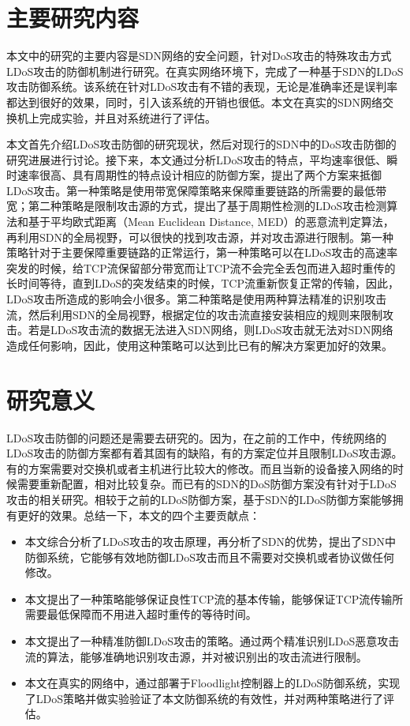 \section{主要研究内容}
\label{sec:work}
本文中的研究的主要内容是SDN网络的安全问题，针对DoS攻击的特殊攻击方式LDoS攻击的防御机制进行研究。在真实网络环境下，完成了一种基于SDN的LDoS攻击防御系统。该系统在针对LDoS攻击有不错的表现，无论是准确率还是误判率都达到很好的效果，同时，引入该系统的开销也很低。本文在真实的SDN网络交换机上完成实验，并且对系统进行了评估。

本文首先介绍LDoS攻击防御的研究现状，然后对现行的SDN中的DoS攻击防御的研究进展进行讨论。接下来，本文通过分析LDoS攻击的特点，平均速率很低、瞬时速率很高、具有周期性的特点设计相应的防御方案，提出了两个方案来抵御LDoS攻击。第一种策略是使用带宽保障策略来保障重要链路的所需要的最低带宽；第二种策略是限制攻击源的方式，提出了基于周期性检测的LDoS攻击检测算法和基于平均欧式距离（Mean Euclidean Distance, MED）的恶意流判定算法，再利用SDN的全局视野，可以很快的找到攻击源，并对攻击源进行限制。第一种策略针对于主要保障重要链路的正常运行，第一种策略可以在LDoS攻击的高速率突发的时候，给TCP流保留部分带宽而让TCP流不会完全丢包而进入超时重传的长时间等待，直到LDoS的突发结束的时候，TCP流重新恢复正常的传输，因此，LDoS攻击所造成的影响会小很多。第二种策略是使用两种算法精准的识别攻击流，然后利用SDN的全局视野，根据定位的攻击流直接安装相应的规则来限制攻击。若是LDoS攻击流的数据无法进入SDN网络，则LDoS攻击就无法对SDN网络造成任何影响，因此，使用这种策略可以达到比已有的解决方案更加好的效果。


\section{研究意义}
\label{sec:contribution}
LDoS攻击防御的问题还是需要去研究的。因为，在之前的工作中，传统网络的LDoS攻击的防御方案都有着其固有的缺陷，有的方案定位并且限制LDoS攻击源。有的方案需要对交换机或者主机进行比较大的修改。而且当新的设备接入网络的时候需要重新配置，相对比较复杂。而已有的SDN的DoS防御方案没有针对于LDoS攻击的相关研究。相较于之前的LDoS防御方案，基于SDN的LDoS防御方案能够拥有更好的效果。总结一下，本文的四个主要贡献点：

\begin{itemize}
    \item 本文综合分析了LDoS攻击的攻击原理，再分析了SDN的优势，提出了SDN中防御系统，它能够有效地防御LDoS攻击而且不需要对交换机或者协议做任何修改。
    \item 本文提出了一种策略能够保证良性TCP流的基本传输，能够保证TCP流传输所需要最低保障而不用进入超时重传的等待时间。
    \item 本文提出了一种精准防御LDoS攻击的策略。通过两个精准识别LDoS恶意攻击流的算法，能够准确地识别攻击源，并对被识别出的攻击流进行限制。
    \item 本文在真实的网络中，通过部署于Floodlight控制器上的LDoS防御系统，实现了LDoS策略并做实验验证了本文防御系统的有效性，并对两种策略进行了评估。
\end{itemize}

